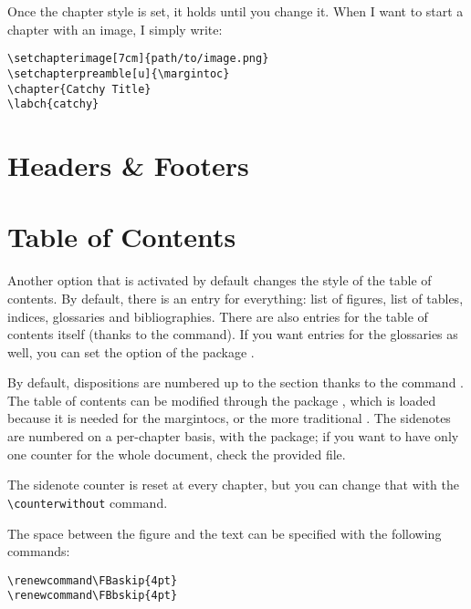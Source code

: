 Once the chapter style is set, it holds until you change it. When I want 
to start a chapter with an image, I simply write:

\begin{lstlisting}
\setchapterimage[7cm]{path/to/image.png}
\setchapterpreamble[u]{\margintoc}
\chapter{Catchy Title}
\labch{catchy}
\end{lstlisting}

\section{Headers \& Footers}

\blindtext

\section{Table of Contents}

Another option that is activated by default changes the style of the 
table of contents. By default, there is an entry for everything: list of 
figures, list of tables, indices, glossaries and bibliographies. There 
are also entries for the table of contents itself (thanks to the 
 command). If you want entries for the 
glossaries as well, you can set the  option of the package 
.

By default, dispositions are numbered up to the section thanks to the 
command . The table of contents 
can be modified through the package , which is loaded 
because it is needed for the margintocs, or the more traditional 
. The sidenotes are numbered on a per-chapter basis, 
with the  package; if you want to have only one 
counter for the whole document, check the provided  
file.


The sidenote counter is reset at every chapter, but you can change that 
with the \verb|\counterwithout| command.

 The space between the figure and the text can be specified with the 
following commands:

\begin{lstlisting}[style=kaolstplain]
\renewcommand\FBaskip{4pt}
\renewcommand\FBbskip{4pt}
\end{lstlisting}


